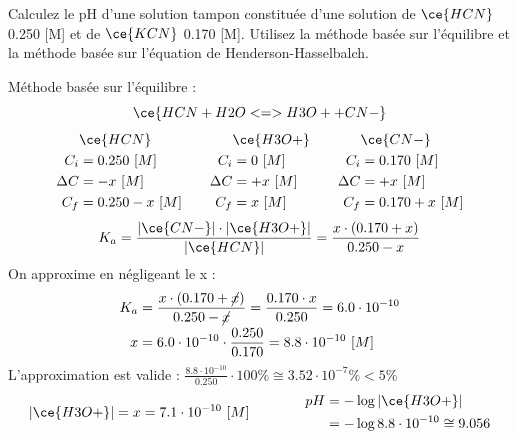 \documentclass[
  11pt,
  a4paper,
  openany]{book}
\begin{document}
\begin{Exercise}
Calculez le pH d'une solution tampon constituée d'une solution de \(\ce{HCN}\) 0.250 {[}M{]} et de \(\ce{KCN}\) 0.170 {[}M{]}. Utilisez la méthode basée sur l'équilibre et la méthode basée sur l'équation de Henderson-Hasselbalch.

\end{Exercise}

\begin{Answer}
Méthode basée sur l'équilibre :
\[
\ce{HCN + H2O <=> H3O+ + CN-}
\]
\[
\begin{split}
&\ce{HCN}\\
C_i &= 0.250\ [M] \\
\Delta C &= - x\ [M] \\
C_f &= 0.250 - x\ [M] \\
\end{split}
\qquad
\begin{split}
&\ce{H3O+}\\
C_i &= 0\ [M] \\
\Delta C &= + x\ [M] \\
C_f &= x\ [M] \\
\end{split}
\qquad
\begin{split}
&\ce{CN-}\\
C_i &= 0.170\ [M] \\
\Delta C &= + x\ [M] \\
C_f &= 0.170 + x\ [M] \\
\end{split}
\]
\[
K_a = \frac{|\ce{CN-}| \cdot |\ce{H3O+}|}{|\ce{HCN}|} = \frac{x \cdot (0.170 + x)}{0.250 - x}
\]
On approxime en négligeant le x :
\[
\begin{split}
K_a &= \frac{x \cdot (0.170 + \cancel{x})}{0.250 - \cancel{x}} = \frac{0.170 \cdot x}{0.250} = 6.0 \cdot 10^{-10} \\
x &= 6.0 \cdot 10^{-10} \cdot \frac{0.250}{0.170} = 8.8 \cdot 10^{-10}\ [M]
\end{split}
\]
L'approximation est valide : \(\frac{8.8 \cdot 10^{-10}}{0.250} \cdot 100\% \cong 3.52 \cdot 10^{-7}\% < 5\%\)
\[
\begin{split}
|\ce{H3O+}| = x = 7.1 \cdot 10^{-10}\ [M]
\end{split}
\qquad\qquad
\begin{split}
pH &= - \log |\ce{H3O+}| \\
 &= - \log 8.8 \cdot 10^{-10} \cong 9.056
\end{split}
\]


\end{Answer}
\end{document}
